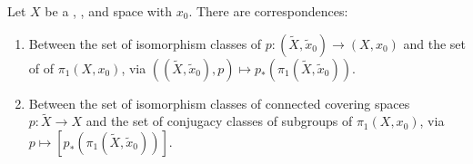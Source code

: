 \begin{proposition} \label{proposition:isom_class_of_conn_pointed_covers_of_a_conn_loc_path_conn_semiloc_simp_conn_pointed_space_corresponds_to_subgroup_of_fund_gp}
Let $X$ be a , , and  space with  $x_0$. There are  correspondences:
\begin{enumerate}
    \item Between the set of isomorphism classes of   $p: (\tilde{X}, \tilde{x}_0) \to (X, x_0)$ and the set of  of $\pi_1(X, x_0)$, via $((\tilde{X}, \tilde{x}_0), p) \mapsto p_*(\pi_1(\tilde{X}, \tilde{x}_0))$.
    \item Between the set of isomorphism classes of connected covering spaces $p: \tilde{X} \to X$ and the set of conjugacy classes of subgroups of $\pi_1(X, x_0)$, via $p \mapsto [p_*(\pi_1(\tilde{X}, \tilde{x}_0))]$.
\end{enumerate}
\end{proposition}